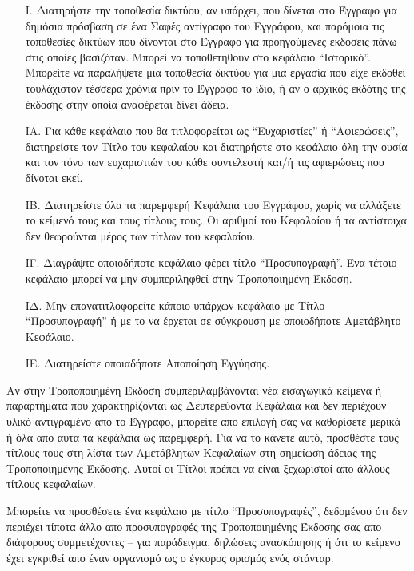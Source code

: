 \begin{itemize}
\item[Ι.]
    Διατηρήστε την τοποθεσία δικτύου, αν υπάρχει, που δίνεται στο Έγγραφο για δημόσια πρόσβαση σε ένα Σαφές αντίγραφο του Εγγράφου, και παρόμοια τις τοποθεσίες δικτύων που δίνονται στο Έγγραφο για προηγούμενες εκδόσεις πάνω στις οποίες βασιζόταν. Μπορεί να τοποθετηθούν στο κεφάλαιο “Ιστορικό”. Μπορείτε να παραλήψετε μια τοποθεσία δικτύου για μια εργασία που είχε εκδοθεί τουλάχιστον τέσσερα χρόνια πριν το Έγγραφο το ίδιο, ή αν ο αρχικός εκδότης της έκδοσης στην οποία αναφέρεται δίνει άδεια.
   
\item[ΙΑ.]
   Για κάθε κεφάλαιο που θα τιτλοφορείται ως “Ευχαριστίες” ή “Αφιερώσεις”, διατηρείστε τον Τίτλο του κεφαλαίου και διατηρήστε στο κεφάλαιο όλη την ουσία και τον τόνο των ευχαριστιών του κάθε συντελεστή και/ή τις αφιερώσεις που δίνοται εκεί.
   
\item[ΙΒ.]
   Διατηρείστε όλα τα παρεμφερή Κεφάλαια του Εγγράφου, χωρίς να αλλάξετε το κείμενό τους και τους τίτλους τους. Οι αριθμοί του Κεφαλαίου ή τα αντίστοιχα δεν θεωρούνται μέρος των τίτλων του κεφαλαίου.
   
\item[ΙΓ.]
   Διαγράψτε οποιοδήποτε κεφάλαιο φέρει τίτλο “Προσυπογραφή”. Ένα τέτοιο κεφάλαιο μπορεί να μην συμπεριληφθεί στην Τροποποιημένη Έκδοση.
   
\item[ΙΔ.]
   Μην επανατιτλοφορείτε κάποιο υπάρχων κεφάλαιο με Τίτλο “Προσυπογραφή” ή με το να έρχεται σε σύγκρουση με οποιοδήποτε Αμετάβλητο Κεφάλαιο.
   
\item[ΙΕ.]
    Διατηρείστε οποιαδήποτε Αποποίηση Εγγύησης.
\end{itemize}

Αν στην Τροποποιημένη Έκδοση συμπεριλαμβάνονται νέα εισαγωγικά κείμενα ή παραρτήματα που χαρακτηρίζονται ως Δευτερεύοντα Κεφάλαια και δεν περιέχουν υλικό αντιγραμένο απο το Έγγραφο, μπορείτε απο επιλογή σας να καθορίσετε μερικά ή όλα απο αυτα τα κεφάλαια ως παρεμφερή. Για να το κάνετε αυτό, προσθέστε τους τίτλους τους στη λίστα των Αμετάβλητων Κεφαλαίων στη σημείωση άδειας της Τροποποιημένης Έκδοσης. Αυτοί οι Τίτλοι πρέπει να είναι ξεχωριστοί απο άλλους τίτλους κεφαλαίων.

Μπορείτε να προσθέσετε ένα κεφάλαιο με τίτλο “Προσυπογραφές”, δεδομένου ότι δεν περιέχει τίποτα άλλο απο προσυπογραφές της Τροποποιημένης Έκδοσης σας απο διάφορους συμμετέχοντες – για παράδειγμα, δηλώσεις ανασκόπησης ή ότι το κείμενο έχει εγκριθεί απο έναν οργανισμό ως ο έγκυρος ορισμός ενός στάνταρ.

